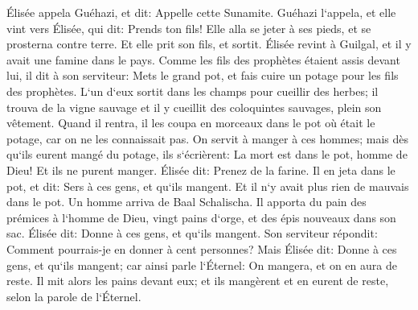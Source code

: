 \verse Élisée appela Guéhazi, et dit: Appelle cette Sunamite. Guéhazi l`appela, et elle vint vers Élisée, qui dit: Prends ton fils! 
\verse Elle alla se jeter à ses pieds, et se prosterna contre terre. Et elle prit son fils, et sortit. 
\verse Élisée revint à Guilgal, et il y avait une famine dans le pays. Comme les fils des prophètes étaient assis devant lui, il dit à son serviteur: Mets le grand pot, et fais cuire un potage pour les fils des prophètes. 
\verse L`un d`eux sortit dans les champs pour cueillir des herbes; il trouva de la vigne sauvage et il y cueillit des coloquintes sauvages, plein son vêtement. Quand il rentra, il les coupa en morceaux dans le pot où était le potage, car on ne les connaissait pas. 
\verse On servit à manger à ces hommes; mais dès qu`ils eurent mangé du potage, ils s`écrièrent: La mort est dans le pot, homme de Dieu! Et ils ne purent manger. 
\verse Élisée dit: Prenez de la farine. Il en jeta dans le pot, et dit: Sers à ces gens, et qu`ils mangent. Et il n`y avait plus rien de mauvais dans le pot. 
\verse Un homme arriva de Baal Schalischa. Il apporta du pain des prémices à l`homme de Dieu, vingt pains d`orge, et des épis nouveaux dans son sac. Élisée dit: Donne à ces gens, et qu`ils mangent. 
\verse Son serviteur répondit: Comment pourrais-je en donner à cent personnes? Mais Élisée dit: Donne à ces gens, et qu`ils mangent; car ainsi parle l`Éternel: On mangera, et on en aura de reste. 
\verse Il mit alors les pains devant eux; et ils mangèrent et en eurent de reste, selon la parole de l`Éternel. 

